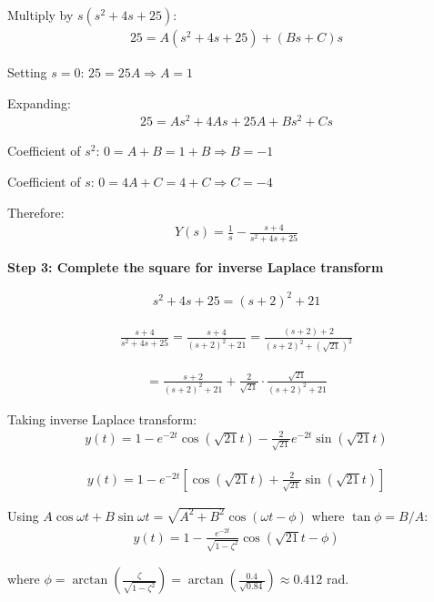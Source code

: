 \documentclass[11pt,a4paper]{article}
\begin{document}
Multiply by $s(s^2 + 4s + 25)$:
\begin{align}
  25 = A(s^2 + 4s + 25) + (Bs + C)s
\end{align}

Setting $s = 0$: $25 = 25A \Rightarrow A = 1$

Expanding:
\begin{align}
  25 = As^2 + 4As + 25A + Bs^2 + Cs
\end{align}

Coefficient of $s^2$: $0 = A + B = 1 + B \Rightarrow B = -1$

Coefficient of $s$: $0 = 4A + C = 4 + C \Rightarrow C = -4$

Therefore:
\begin{align}
  Y(s) = \frac{1}{s} - \frac{s + 4}{s^2 + 4s + 25}
\end{align}

\textbf{Step 3: Complete the square for inverse Laplace transform}

\begin{align}
  s^2 + 4s + 25 = (s+2)^2 + 21
\end{align}

\begin{align}
  \frac{s + 4}{s^2 + 4s + 25} = \frac{s + 4}{(s+2)^2 + 21} = \frac{(s+2) + 2}{(s+2)^2 + (\sqrt{21})^2}
\end{align}

\begin{align}
  = \frac{s+2}{(s+2)^2 + 21} + \frac{2}{\sqrt{21}} \cdot \frac{\sqrt{21}}{(s+2)^2 + 21}
\end{align}

Taking inverse Laplace transform:
\begin{align}
  y(t) = 1 - e^{-2t}\cos(\sqrt{21}t) - \frac{2}{\sqrt{21}}e^{-2t}\sin(\sqrt{21}t)
\end{align}

\begin{align}
  y(t) = 1 - e^{-2t}\left[\cos(\sqrt{21}t) + \frac{2}{\sqrt{21}}\sin(\sqrt{21}t)\right]
\end{align}

Using $A\cos\omega t + B\sin\omega t = \sqrt{A^2+B^2}\cos(\omega t - \phi)$ where $\tan\phi = B/A$:
\begin{align}
  y(t) = 1 - \frac{e^{-2t}}{\sqrt{1 - \zeta^2}}\cos(\sqrt{21}t - \phi)
\end{align}

where $\phi = \arctan\left(\frac{\zeta}{\sqrt{1-\zeta^2}}\right) = \arctan\left(\frac{0.4}{\sqrt{0.84}}\right) \approx 0.412$ rad.
\end{document}
